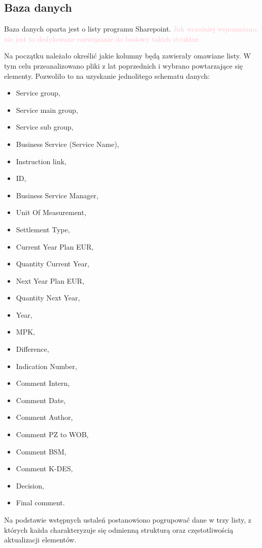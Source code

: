 \subsection{Baza danych}

Baza danych oparta jest o listy programu Sharepoint. \textcolor{pink}{Jak wcześniej wspomniano, nie jest to dedykowane rozwiązanie do budowy takich struktur. }

Na początku należało określić jakie kolumny będą zawierały omawiane listy. W tym celu przeanalizowano pliki z lat poprzednich i wybrano powtarzające się elementy. Pozwoliło to na uzyskanie jednolitego schematu danych:
\begin{itemize}
    \item Service group,
    \item Service main group,
    \item Service sub group,
    \item Business Service (Service Name),
    \item Instruction link,
    \item ID,
    \item Business Service Manager,
    \item Unit Of Measurement,
    \item Settlement Type,
    \item Current Year Plan EUR,
    \item Quantity Current Year,
    \item Next Year Plan EUR,
    \item Quantity Next Year,
    \item Year,
    \item MPK,
    \item Difference,
    \item Indication Number,
    \item Comment Intern,
    \item Comment Date,
    \item Comment Author,
    \item Comment PZ to WOB,
    \item Comment BSM,
    \item Comment K-DES,
    \item Decision,
    \item Final comment.
\end{itemize} 
Na podstawie wstępnych ustaleń postanowiono pogrupować dane w trzy listy, z których każda charakteryzuje się odmienną strukturą oraz częstotliwością aktualizacji elementów.

